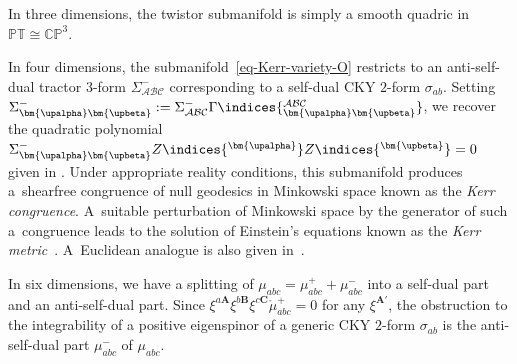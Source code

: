 \documentclass[pdftex]{sigma}
\numberwithin{equation}{section}
\newcommand{\mbf} [1]{\mathbf{#1}}
\newcommand{\mc} [1]{\mathcal{#1}}
\newcommand{\mr}[1] {\mathring{#1}}
\newcommand{\ind} {\indices}
\newcommand{\PT} {\mathbb{PT}}
\newcommand{\CP} {\mathbb{CP}}
\begin{document}
\begin{Remark}In three dimensions, the twistor submanifold is simply a smooth quadric in $\PT \cong \CP^3$.

In four dimensions, the submanifold~\eqref{eq-Kerr-variety-O} restricts to an anti-self-dual tractor $3$-form $\Sigma^- _{\mc{A} \mc{B} \mc{C}}$ corresponding to a self-dual CKY $2$-form $\sigma_{ab}$. Setting $\Sigma^-_{{\bm{\upalpha}} {\bm{\upbeta}}} := \Sigma^- _{\mc{A} \mc{B} \mc{C}} \Gamma \ind{^{\mc{A} \mc{B} \mc{C}}_{{\bm{\upalpha}} {\bm{\upbeta}}}}$, we recover the quadratic polynomial $\Sigma^-_{{\bm{\upalpha}} {\bm{\upbeta}}} Z \ind{^{\bm{\upalpha}}} Z \ind{^{\bm{\upbeta}}} = 0$ given in \cite{Penrose1986}. Under appropriate reality conditions, this submanifold produces a~shearfree congruence of null geodesics in Minkowski space known as the \emph{Kerr congruence}. A~suitable perturbation of Minkowski space by the generator of such a~congruence leads to the solution of Einstein's equations known as the \emph{Kerr metric}~\cite{Kerr1963,Kerr2009}. A~Euclidean analogue is also given in~\cite{Salamon2009}.

In six dimensions, we have a splitting of $\mu_{abc} = \mu^+_{abc} + \mu^-_{abc}$ into a self-dual part and an anti-self-dual part. Since $\xi^{a\mbf{A}} \xi^{b\mbf{B}} \xi^{c\mbf{C}} \mr{\mu}^+_{abc} = 0$ for any $\xi^{\mbf{A}'}$, the obstruction to the integrability of a positive eigenspinor of a generic CKY $2$-form $\sigma_{ab}$ is the anti-self-dual part $\mu^-_{abc}$ of $\mu_{abc}$.
\end{Remark}
\end{document}
